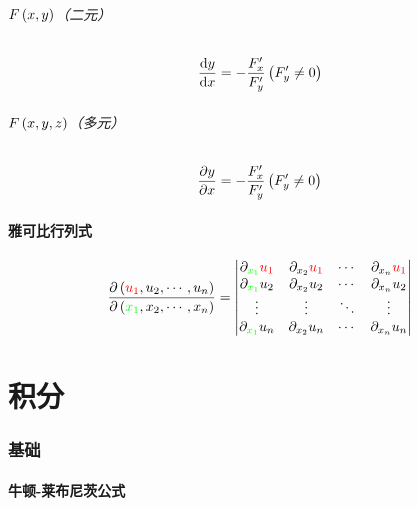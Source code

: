 \documentclass{article}
\begin{document}
\paragraph{$F\left(x,y\right)$（二元）}

\[\frac{\mathrm d y}{\mathrm d x}=-\frac{F_x^\prime}{F_y^\prime}\left(F_y^\prime\neq0\right)\]

\paragraph{$F\left(x,y,z\right)$（多元）}

\[\frac{\partial y}{\partial x}=-\frac{F_x^\prime}{F_y^\prime}\left(F_y^\prime\neq0\right)\]

\subsection{雅可比行列式}

\[\frac{\partial\left(\textcolor{red}{u_1},u_2,\cdots,u_n\right)}{\partial\left(\textcolor{green}{x_1},x_2,\cdots,x_n\right)}=
    \begin{vmatrix}
        \partial_{\textcolor{green}{x_1}}\textcolor{red}{u_1} & \partial_{x_2}\textcolor{red}{u_1} &
        \cdots                                                & \partial_{x_n}\textcolor{red}{u_1}                   \\
        \partial_{\textcolor{green}{x_1}}u_2                  & \partial_{x_2}u_2                  &
        \cdots                                                & \partial_{x_n}u_2                                    \\
        \vdots                                                & \vdots                             & \ddots & \vdots \\
        \partial_{\textcolor{green}{x_1}}u_n                  & \partial_{x_2}u_n                  &
        \cdots                                                & \partial_{x_n}u_n
    \end{vmatrix}\]

\part{积分}

\section{基础}

\subsection{牛顿-莱布尼茨公式}
\end{document}
